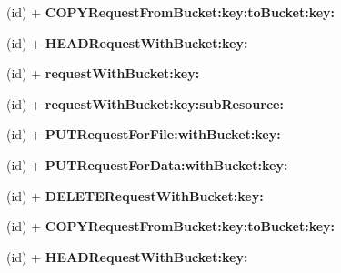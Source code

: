 \begin{DoxyCompactItemize}
\item 
\hypertarget{interface_a_s_i_s3_object_request_a0048cc08b9cfef9c78abd81faa472d48}{
(id) + {\bfseries \-C\-O\-P\-Y\-Request\-From\-Bucket\-:key\-:to\-Bucket\-:key\-:}}
\label{interface_a_s_i_s3_object_request_a0048cc08b9cfef9c78abd81faa472d48}

\item 
\hypertarget{interface_a_s_i_s3_object_request_a88538201f1def9da2ff385880b78c8ef}{
(id) + {\bfseries \-H\-E\-A\-D\-Request\-With\-Bucket\-:key\-:}}
\label{interface_a_s_i_s3_object_request_a88538201f1def9da2ff385880b78c8ef}

\item 
\hypertarget{interface_a_s_i_s3_object_request_a8fc06d7585b85db69f81678fc1560ab0}{
(id) + {\bfseries request\-With\-Bucket\-:key\-:}}
\label{interface_a_s_i_s3_object_request_a8fc06d7585b85db69f81678fc1560ab0}

\item 
\hypertarget{interface_a_s_i_s3_object_request_aac357e6e8d9eab201a5d97c6e2ad1574}{
(id) + {\bfseries request\-With\-Bucket\-:key\-:sub\-Resource\-:}}
\label{interface_a_s_i_s3_object_request_aac357e6e8d9eab201a5d97c6e2ad1574}

\item 
\hypertarget{interface_a_s_i_s3_object_request_a07ff4bdb86902d59cb602be9bdc7ac14}{
(id) + {\bfseries \-P\-U\-T\-Request\-For\-File\-:with\-Bucket\-:key\-:}}
\label{interface_a_s_i_s3_object_request_a07ff4bdb86902d59cb602be9bdc7ac14}

\item 
\hypertarget{interface_a_s_i_s3_object_request_a06b5bf032c9b54a0fd0b17e0d1fecad5}{
(id) + {\bfseries \-P\-U\-T\-Request\-For\-Data\-:with\-Bucket\-:key\-:}}
\label{interface_a_s_i_s3_object_request_a06b5bf032c9b54a0fd0b17e0d1fecad5}

\item 
\hypertarget{interface_a_s_i_s3_object_request_a0602fac9aee5730f513b0a49e2be0dd9}{
(id) + {\bfseries \-D\-E\-L\-E\-T\-E\-Request\-With\-Bucket\-:key\-:}}
\label{interface_a_s_i_s3_object_request_a0602fac9aee5730f513b0a49e2be0dd9}

\item 
\hypertarget{interface_a_s_i_s3_object_request_a0048cc08b9cfef9c78abd81faa472d48}{
(id) + {\bfseries \-C\-O\-P\-Y\-Request\-From\-Bucket\-:key\-:to\-Bucket\-:key\-:}}
\label{interface_a_s_i_s3_object_request_a0048cc08b9cfef9c78abd81faa472d48}

\item 
\hypertarget{interface_a_s_i_s3_object_request_a88538201f1def9da2ff385880b78c8ef}{
(id) + {\bfseries \-H\-E\-A\-D\-Request\-With\-Bucket\-:key\-:}}
\label{interface_a_s_i_s3_object_request_a88538201f1def9da2ff385880b78c8ef}


\end{DoxyCompactItemize}
